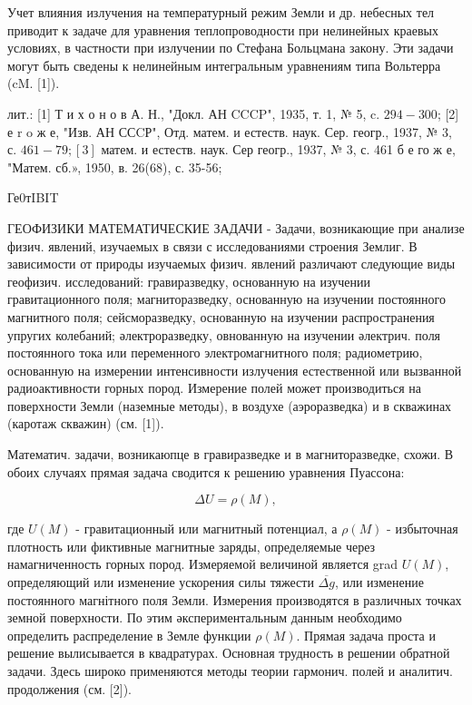 \documentclass[10pt]{article}
\begin{document}
Учет влияния излучения на температурный режим Земли и др. небесных тел приводит к задаче для уравнения теплопроводности при нелинейных краевых условиях, в частности при излучении по Стефана Больцмана закону. Эти задачи могут быть сведены к нелинейным интегральным уравнениям типа Вольтерра (cM. [1]).



лит.: [1] Т и х о н о в А. Н., "Докл. АН CCCP", 1935, т. 1, № 5, c. $294-300$; [2] е $\mathrm{r}$ o ж е, "Изв. АН ССCР", Отд. матем. и естеств. наук. Сер. геогр., 1937, № 3, с. $461-79 ;[3]$ матем. и естеств. наук. Сер геогр., 1937, № 3, с. 461 б е го ж е, "Матем. сб.», 1950, в. 26(68), с. 35-56;



Ге0тIBIT



ГЕОФИЗИКИ МАТЕМАТИЧЕСКИЕ ЗАДАЧИ - Задачи, возникающие при анализе физич. явлений, изучаемых в связи с исследованиями строения Землиг. В зависимости от природы изучаемых физич. явлений различают следующие виды геофизич. исследований: гравиразведку, основанную на изучении гравитационного поля; магниторазведку, основанную на изучении постоянного магнитного поля; сейсморазведку, основанную на изучении распространения упругих колебаний; әлектроразведку, овнованную на изучении әлектрич. поля постоянного тока или переменного электромагнитного поля; радиометрию, основанную на измерении интенсивности излучения естественной или вызванной радиоактивности горных пород. Измерение полей может производиться на поверхности Земли (наземные методы), в воздухе (аэроразведка) и в скважинах (каротаж скважин) (см. [1]).



Математич. задачи, возникаюпце в гравиразведке и в магниторазведке, схожи. В обоих случаях прямая задача сводится к решению уравнения Пуассона:



\[

\Delta U=\rho(M),

\]



где $U(M)$ - гравитационный или магнитный потенциал, а $\rho(M)$ - избыточная плотность или фиктивные магнитные заряды, определяемые через намагниченность горных пород. Измеряемой величиной является grad $U(M)$, определяющий или изменение ускорения силы тяжести $\overline{\Delta g}$, или изменение постоянного магнітного поля Земли. Измерения производятся в различных точках земной поверхности. По этим әкспериментальным данным необходимо определить распределение в Земле функции $\rho(M)$. Прямая задача проста и решение вылисывается в квадратурах. Основная трудность в решении обратной задачи. Здесь широко применяются методы теории гармонич. полей и аналитич. продолжения (см. [2]).
\end{document}
